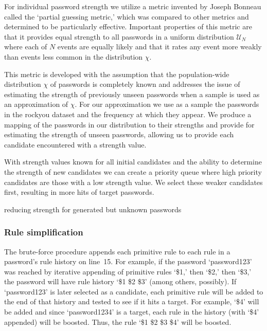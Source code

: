 \documentclass[letterpaper,twocolumn,10pt]{article}
\begin{document}
For individual password strength we utilize a metric invented by Joseph Bonneau called
the `partial guessing metric,'\cite{bonneau2012statistical} which was compared to other metrics and determined
to be particularly effective. Important properties of this metric are that it provides
equal strength to all passwords in a uniform distribution $\mathcal{U}_{N}$
where each of $N$ events
are equally likely and that it rates any event more weakly than events less common in the
distribution $\chi$. 

This metric is developed with the assumption that the
population-wide distribution $\chi$ of passwords is completely known and addresses the issue
of estimating the strength of previously unseen passwords when a sample is used as an approximation
of $\chi$. For our approximation we use as a sample the passwords in the rockyou dataset and the
frequency at which they appear. We produce a mapping of the passwords in our distribution
to their strengths and provide for estimating the strength of unseen passwords, allowing us
to provide each candidate encountered with a strength value.

With strength values known for all initial candidates and the ability to determine the strength
of new candidates we can create a priority queue where high priority candidates are those
with a low strength value. We select these weaker candidates first, resulting in more hits
of target passwords.


reducing strength for generated but unknown passwords


\subsubsection{Rule simplification}

The brute-force procedure appends each primitive rule to each rule in a
password's rule history on line~15. For example, if the password `password123'
was reached by iterative appending of primitive rules `\$1,' then `\$2,' then
`\$3,' the password will have rule history `\$1 \$2 \$3' (among others,
possibly). If `password123' is later selected as a candidate, each primitive
rule will be added to the end of that history and tested to see if it hits a
target. For example, `\$4' will be added and since `password1234' is a target,
each rule in the history (with `\$4' appended) will be boosted. Thus, the rule
`\$1 \$2 \$3 \$4' will be boosted.
\end{document}
